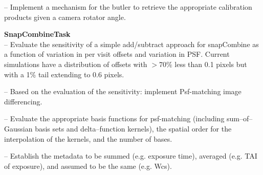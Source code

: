 \documentclass[prd, nofootinbib, floatfix, 11pt,tightenlines,times]{article}
\def\arcsec{^{\prime\prime}}
\begin{document}
-- Implement a mechanism for the butler to retrieve the appropriate calibration products given a camera rotator angle.

{\bf SnapCombineTask}\\

-- Evaluate the sensitivity of a simple add/subtract approach for
snapCombine as a function of variation in per visit offsets and
variation in PSF. Current simulations have a distribution of offsets
with $>$70\% less than 0.1 pixels but with a 1\% tail extending to 0.6
pixels.

-- Based on the evaluation of the sensitivity: implement Psf-matching
image differencing.

-- Evaluate the appropriate basis functions for psf-matching
(including sum--of--Gaussian basis sets and  delta--function kernels),
the spatial order for the interpolation of the kernels,  and the
number of bases.

-- Establish the metadata to be summed (e.g. exposure time), averaged
(e.g. TAI of exposure), and assumed to be the same (e.g. Wcs).




%


\end{document}
